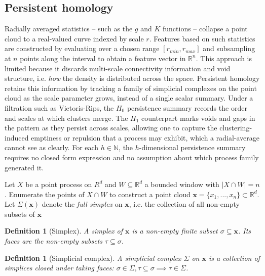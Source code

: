 \documentclass[11pt,letterpaper]{article}
\newcommand{\R}{\mathbb{R}}
\newcommand{\N}{\mathbb{N}}
\newcommand{\1}{\mathds{1}}
\newcommand{\pc}{\mathbf{x}}
\newcommand{\simpcom}{\Sigma}
\theoremstyle{plain}
\theoremstyle{definitioncolon}
\newtheorem{definition}[theorem]{Definition}
\begin{document}
\subsection{Persistent homology}
\label{ssec:persistence}

Radially averaged statistics -- such as the $g$ and $K$ functions -- collapse
a point cloud to a real-valued curve indexed by scale $r$. Features based on such
statistics are constructed by evaluating over a chosen range $[r_{min}, r_{max}]$
and subsampling at $n$ points along the interval to obtain a feature vector in $\R^n$.
This approach is limited because it discards multi-scale connectivity information and
void structure, i.e. \emph{how} the density is distributed across the space.
Persistent homology retains this information by tracking a family of simplicial
complexes on the point cloud as the scale parameter grows, instead of a single scalar
summary. Under a filtration such as Vietoris-Rips, the $H_0$ persistence summary records
the order and scales at which clusters merge. The $H_1$ counterpart marks voids and gaps
in the pattern as they persist across scales, allowing one to capture the clustering-induced
emptiness or repulsion that a process may exhibit, which a radial-average cannot see as clearly.
For each $h \in \N$, the $h$-dimensional persistence summary requires no closed form expression
and no assumption about which process family generated it.

Let $X$ be a point process on $R^d$ and $W \subseteq \R^d$ a bounded window with
$|X \cap W| = n$ . Enumerate the points of $X \cap W$ to construct a point cloud
$\pc = \{x_1, ..., x_n\} \subset \R^d$. Let $\Sigma(\pc)$ denote the \emph{full
simplex} on $\pc$, i.e. the collection of all non-empty subsets of $\pc$

    \begin{definition}[Simplex]
        A \emph{simplex} of $\pc$ is a non-empty finite subset
        $\sigma \subseteq \pc$. Its faces are the non-empty subsets
        $\tau \subseteq \sigma$.
    \end{definition}

    \begin{definition}[Simplicial complex]
        A simplicial complex $\simpcom$ on $\pc$ is a collection of simplices
        closed under taking faces: $\sigma \in \simpcom, \tau \subseteq \sigma
        \implies \tau \in \simpcom$.
    \end{definition}
\end{document}
